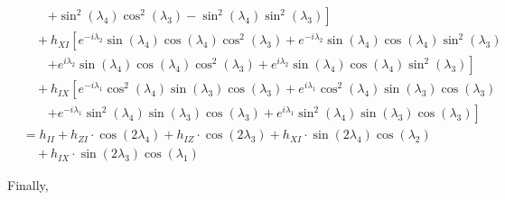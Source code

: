 \documentclass{aux/ttuthes2007}
\newcommand{\s}[1]{\sin\left( #1 \right)}
\newcommand{\ssq}[1]{\sin^2\left( #1 \right)}
\newcommand{\co}[1]{\cos\left( #1 \right)}
\newcommand{\cosq}[1]{\cos^2\left( #1 \right)}
\begin{document}
\begin{align*}
%
			\\
		&\qquad \left .
%
				+	\ssq {\lambda_4}\cosq {\lambda_3}
				- 	\ssq {\lambda_4}\ssq {\lambda_3}
			\right ]
%
		\\ 
		&\quad
% 
		+	h_{XI}
			\left [
				e^{-i\lambda_2}\s {\lambda_4}\co {\lambda_4}\cosq {\lambda_3}
			+ 	e^{-i\lambda_2}\s {\lambda_4 }\co {\lambda_4 }\ssq {\lambda_3}
			\right .
%
			\\
%
				&\qquad \left . 
			+ 	e^{i\lambda_2}\s {\lambda_4}\co {\lambda_4}\cosq {\lambda_3}
			+ 	e^{i\lambda_2}\s {\lambda_4}\co {\lambda_4}\ssq {\lambda_3}
			\right ]
%
	\\
	&\quad
		+	h_{IX}
			\left [
				e^{-i\lambda_1}\cosq {\lambda_4}\s {\lambda_3}\co {\lambda_3}
			+ 	e^{i\lambda_1}\cosq {\lambda_4 }\s {\lambda_3}\co {\lambda_3}
			\right .
%
			\\
%
				&\qquad \left . 
			+ 	e^{-i\lambda_1}\ssq {\lambda_4}\s {\lambda_3}\co {\lambda_3}
			+ 	e^{i\lambda_1}\ssq {\lambda_4}\s {\lambda_3}\co {\lambda_3}
			\right ]
%
%
	\\
%
%
		&=	h_{II}
		+	h_{ZI} \cdot \co {2 \lambda_4}
		+	h_{IZ} \cdot \co {2 \lambda_3}
		+	h_{XI} \cdot \s  {2 \lambda_4} \co {\lambda_2}
%
	\\
	&\quad
%
		+	h_{IX} \cdot \s  {2 \lambda_3} \co {\lambda_1}
	\end{align*} %

Finally,
\end{document}
